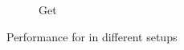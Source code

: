 \begin{figure}[t]
\begin{subfigure}{0.40\textwidth}
      \caption{Get}
      \label{fig:eval_giza_get_four}
    \end{subfigure}
  \caption{Performance for \name in different setups}
\end{figure}

